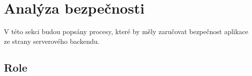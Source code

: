             
            
            

\section{Analýza bezpečnosti}
    V této sekci budou popsány procesy, které by měly zaručovat bezpečnost aplikace ze strany serverového backendu.
    
    \subsection{Role}\label{analyza:bezpecnost:role}
    
